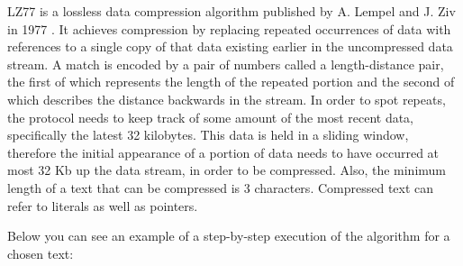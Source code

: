 LZ77 is a lossless data compression algorithm published by A. Lempel and J. Ziv
in 1977 \cite{lz77}. It achieves compression by replacing repeated occurrences 
of data with references to a single copy of that data existing earlier in the 
uncompressed data stream. A match is encoded by a pair of numbers called a 
length-distance pair, the first of which represents the length of the repeated
portion and the second of which describes the distance backwards in the stream.
In order to spot repeats, the protocol needs to keep track of some amount of the
most recent data, specifically the latest 32 kilobytes. This data is held in a
sliding window, therefore the initial appearance of a portion of data needs to have occurred
at most 32 Kb up the data stream, in order to be compressed. Also, the minimum
length of a text that can be compressed is 3 characters. Compressed text can
refer to literals as well as pointers.

Below you can see an example of a step-by-step execution of the algorithm for a
chosen text:

